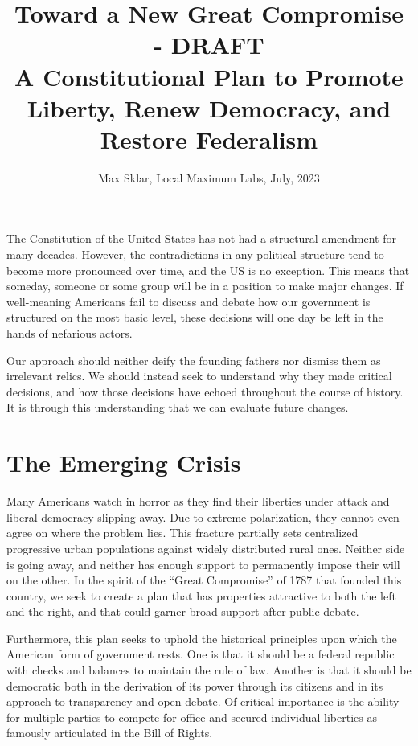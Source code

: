 \documentclass{article}
\newcommand{\quotes}[1]{``#1''}
\begin{document}
\parindent=0in
\parskip=12pt

\title{
  Toward a New Great Compromise - DRAFT \\
  \large{
    A Constitutional Plan to Promote Liberty, Renew Democracy, and Restore Federalism
  }
}

\author{Max Sklar, Local Maximum Labs, July, 2023}
\date{}

\maketitle

The Constitution of the United States has not had a structural amendment for many decades. However, the contradictions in any political structure tend to become more pronounced over time, and the US is no exception. This means that someday, someone or some group will be in a position to make major changes. If well-meaning Americans fail to discuss and debate how our government is structured on the most basic level, these decisions will one day be left in the hands of nefarious actors.

Our approach should neither deify the founding fathers nor dismiss them as irrelevant relics. We should instead seek to understand why they made critical decisions, and how those decisions have echoed throughout the course of history. It is through this understanding that we can evaluate future changes.

\section{The Emerging Crisis}

Many Americans watch in horror as they find their liberties under attack and liberal democracy slipping away. Due to extreme polarization, they cannot even agree on where the problem lies. This fracture partially sets centralized progressive urban populations against widely distributed rural ones. Neither side is going away, and neither has enough support to permanently impose their will on the other. In the spirit of the \quotes{Great Compromise} of 1787 that founded this country, we seek to create a plan that has properties attractive to both the left and the right, and that could garner broad support after public debate.

Furthermore, this plan seeks to uphold the  historical principles upon which the American form of government rests. One is that it should be a federal republic with checks and balances to maintain the rule of law. Another is that it should be democratic both in the derivation of its power through its citizens and in its approach to transparency and open debate. Of critical importance is the ability for multiple parties to compete for office and secured individual liberties as famously articulated in the Bill of Rights.
\end{document}
